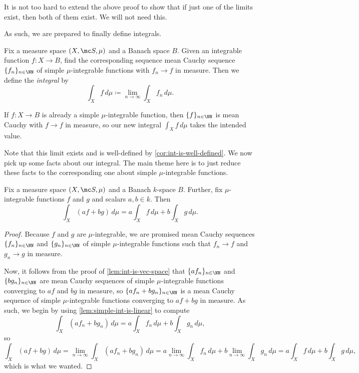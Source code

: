 \documentclass[../notes.tex]{subfiles}
\begin{document}
\begin{remark}
	It is not too hard to extend the above proof to show that if just one of the limits exist, then both of them exist. We will not need this.
\end{remark}
As such, we are prepared to finally define integrals.
\begin{definition}[Integral]
	Fix a measure space $(X,\mc S,\mu)$ and a Banach space $B$. Given an integrable function $f\colon X\to B$, find the corresponding sequence mean Cauchy sequence $\{f_n\}_{n\in\NN}$ of simple $\mu$-integrable functions with $f_n\to f$ in measure. Then we define the \textit{integral} by
	\[\int_Xf\,d\mu\coloneqq\lim_{n\to\infty}\int_Xf_n\,d\mu.\]
\end{definition}
\begin{example}
	If $f\colon X\to B$ is already a simple $\mu$-integrable function, then $\{f\}_{n\in\NN}$ is mean Cauchy with $f\to f$ in measure, so our new integral $\int_Xf\,d\mu$ takes the intended value.
\end{example}
Note that this limit exists and is well-defined by \autoref{cor:int-is-well-defined}. We now pick up some facts about our integral. The main theme here is to just reduce these facts to the corresponding one about simple $\mu$-integrable functions.
\begin{proposition} \label{prop:int-is-linear}
	Fix a measure space $(X,\mc S,\mu)$ and a Banach $k$-space $B$. Further, fix $\mu$-integrable functions $f$ and $g$ and scalars $a,b\in k$. Then
	\[\int_X(af+bg)\,d\mu=a\int_Xf\,d\mu+b\int_Xg\,d\mu.\]
\end{proposition}
\begin{proof}
	Because $f$ and $g$ are $\mu$-integrable, we are promised mean Cauchy sequences $\{f_n\}_{n\in\NN}$ and $\{g_n\}_{n\in\NN}$ of simple $\mu$-integrable functions such that $f_n\to f$ and $g_n\to g$ in measure. 
	
	Now, it follows from the proof of \autoref{lem:int-is-vec-space} that $\{af_n\}_{n\in\NN}$ and $\{bg_n\}_{n\in\NN}$ are mean Cauchy sequences of simple $\mu$-integrable functions converging to $af$ and $bg$ in measure, so $\{af_n+bg_n\}_{n\in\NN}$ is a mean Cauchy sequence of simple $\mu$-integrable functions converging to $af+bg$ in measure. As such, we begin by using \autoref{lem:simple-int-is-linear} to compute
	\[\int_X(af_n+bg_n)\,d\mu=a\int_Xf_n\,d\mu+b\int_Xg_n\,d\mu,\]
	so
	\[\int_X(af+bg)\,d\mu=\lim_{n\to\infty}\int_X(af_n+bg_n)\,d\mu=a\lim_{n\to\infty}\int_Xf_n\,d\mu+b\lim_{n\to\infty}\int_Xg_n\,d\mu=a\int_Xf\,d\mu+b\int_Xg\,d\mu,\]
	which is what we wanted.
\end{proof}
\end{document}
